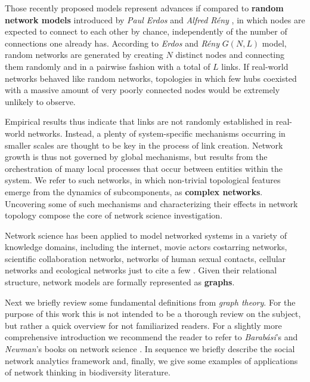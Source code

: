 Those recently proposed models represent advances if compared to \textbf{random network models} introduced by \textit{Paul Erdos} and \textit{Alfred Rény} \cite{erdos1959random}, in which nodes are expected to connect to each other by chance, independently of the number of connections one already has.
According to \textit{Erdos} and \textit{Rény} $G(N,L)$ model, random networks are generated by creating $N$ distinct nodes and connecting them randomly and in a pairwise fashion with a total of $L$ links. 
If real-world networks behaved like random networks, topologies in which few hubs coexisted with a massive amount of very poorly connected nodes would be extremely unlikely to observe. 

Empirical results thus indicate that links are not randomly established in real-world networks.
Instead, a plenty of system-specific mechanisms occurring in smaller scales are thought to be key in the process of link creation.
Network growth is thus not governed by global mechanisms, but results from the orchestration of many local processes that occur between entities within the system.
We refer to such networks, in which non-trivial topological features emerge from the dynamics of subcomponents, as \textbf{complex networks}.
Uncovering some of such mechanisms and characterizing their effects in network topology compose the core of network science investigation.


Network science has been applied to model networked systems in a variety of knowledge domains, including the internet, movie actors costarring networks, scientific collaboration networks, networks of human sexual contacts, cellular networks and ecological networks just to cite a few \cite{Albert2002}.
Given their relational structure, network models are formally represented as \textbf{graphs}.

Next we briefly review some fundamental definitions from \textit{graph theory}.
For the purpose of this work this is not intended to be a thorough review on the subject, but rather a quick overview for not familiarized readers. 
For a slightly more comprehensive introduction we recommend the reader to refer to \textit{Barabási}'s and \textit{Newman}'s books on network science \cite{Barabasibook,Newman2010b}.
In sequence we briefly describe the social network analytics framework and, 
finally, we give some examples of applications of network thinking in biodiversity literature.

